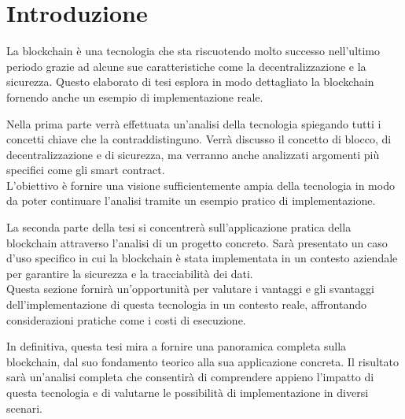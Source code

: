 \section{Introduzione}
La blockchain è una tecnologia che sta riscuotendo molto successo nell'ultimo
periodo grazie ad alcune sue caratteristiche come la decentralizzazione e la
sicurezza. Questo elaborato di tesi esplora in modo dettagliato la blockchain
fornendo anche un esempio di implementazione reale.

Nella prima parte verrà effettuata un'analisi della tecnologia spiegando tutti
i concetti chiave che la contraddistinguno. Verrà discusso il concetto di
blocco, di decentralizzazione e di sicurezza, ma verranno anche analizzati
argomenti più specifici come gli smart contract. \\ 
L'obiettivo è fornire una visione sufficientemente ampia della tecnologia in
modo da poter continuare l'analisi tramite un esempio pratico di
implementazione.

La seconda parte della tesi si concentrerà sull'applicazione pratica della
blockchain attraverso l'analisi di un progetto concreto. Sarà presentato un
caso d'uso specifico in cui la blockchain è stata implementata in un contesto
aziendale per garantire la sicurezza e la tracciabilità dei dati. \\ 
Questa sezione fornirà un'opportunità per valutare i vantaggi e gli svantaggi
dell'implementazione di questa tecnologia in un contesto reale, affrontando
considerazioni pratiche come i costi di esecuzione.

In definitiva, questa tesi mira a fornire una panoramica completa sulla
blockchain, dal suo fondamento teorico alla sua applicazione concreta. Il
risultato sarà un'analisi completa che consentirà di comprendere appieno
l'impatto di questa tecnologia e di valutarne le possibilità di implementazione
in diversi scenari.

